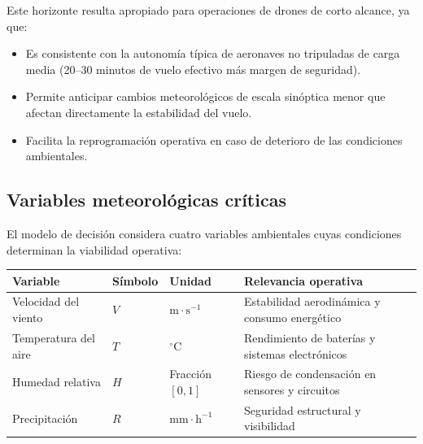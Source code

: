 \documentclass[
  spanish,
  us-letterpaper,
]{scrreprt}
\providecommand{\tightlist}{%
  \setlength{\itemsep}{0pt}\setlength{\parskip}{0pt}}
\numberwithin{equation}{section}
\begin{document}
Este horizonte resulta apropiado para operaciones de drones de corto
alcance, ya que:

\begin{itemize}
\tightlist
\item
  Es consistente con la autonomía típica de aeronaves no tripuladas de
  carga media (20--30 minutos de vuelo efectivo más margen de
  seguridad).
\item
  Permite anticipar cambios meteorológicos de escala sinóptica menor que
  afectan directamente la estabilidad del vuelo.
\item
  Facilita la reprogramación operativa en caso de deterioro de las
  condiciones ambientales.
\end{itemize}

\subsection{Variables meteorológicas
críticas}\label{variables-meteoroluxf3gicas-cruxedticas}

El modelo de decisión considera cuatro variables ambientales cuyas
condiciones determinan la viabilidad operativa:

\begin{longtable}[]{@{}
  >{\raggedright\arraybackslash}p{}
  >{\raggedright\arraybackslash}p{}
  >{\raggedright\arraybackslash}p{}
  >{\raggedright\arraybackslash}p{}@{}}
\toprule\noalign{}
\begin{minipage}[b]{\linewidth}\raggedright
Variable
\end{minipage} & \begin{minipage}[b]{\linewidth}\raggedright
Símbolo
\end{minipage} & \begin{minipage}[b]{\linewidth}\raggedright
Unidad
\end{minipage} & \begin{minipage}[b]{\linewidth}\raggedright
Relevancia operativa
\end{minipage} \\
\midrule\noalign{}
\endhead
\bottomrule\noalign{}
\endlastfoot
Velocidad del viento & \(V\) & \(\mathrm{m \cdot s^{-1}}\) & Estabilidad
aerodinámica y consumo energético \\
Temperatura del aire & \(T\) & \(^\circ\mathrm{C}\) & Rendimiento de
baterías y sistemas electrónicos \\
Humedad relativa & \(H\) & Fracción \([0,1]\) & Riesgo de condensación
en sensores y circuitos \\
Precipitación & \(R\) & \(\mathrm{mm \cdot h^{-1}}\) & Seguridad
estructural y visibilidad \\
\end{longtable}
\end{document}

